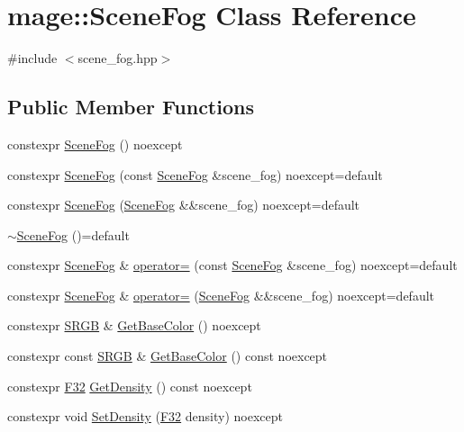 \hypertarget{classmage_1_1_scene_fog}{}\section{mage\+:\+:Scene\+Fog Class Reference}
\label{classmage_1_1_scene_fog}


{\ttfamily \#include $<$scene\+\_\+fog.\+hpp$>$}

\subsection*{Public Member Functions}
\begin{DoxyCompactItemize}
\item 
constexpr \hyperlink{classmage_1_1_scene_fog_a7761b9d8f1c16a175828bf11882717ea}{Scene\+Fog} () noexcept
\item 
constexpr \hyperlink{classmage_1_1_scene_fog_a0b13e24eaa1d54e03b82475a5d0823a8}{Scene\+Fog} (const \hyperlink{classmage_1_1_scene_fog}{Scene\+Fog} \&scene\+\_\+fog) noexcept=default
\item 
constexpr \hyperlink{classmage_1_1_scene_fog_a85281feff6fff05548d29f272f54fe4d}{Scene\+Fog} (\hyperlink{classmage_1_1_scene_fog}{Scene\+Fog} \&\&scene\+\_\+fog) noexcept=default
\item 
\hyperlink{classmage_1_1_scene_fog_afb25181d31f74e4981c226019fee0669}{$\sim$\+Scene\+Fog} ()=default
\item 
constexpr \hyperlink{classmage_1_1_scene_fog}{Scene\+Fog} \& \hyperlink{classmage_1_1_scene_fog_aab29517edb102040e5e4a1c5bad418b8}{operator=} (const \hyperlink{classmage_1_1_scene_fog}{Scene\+Fog} \&scene\+\_\+fog) noexcept=default
\item 
constexpr \hyperlink{classmage_1_1_scene_fog}{Scene\+Fog} \& \hyperlink{classmage_1_1_scene_fog_a2b673372d2dea718361cb5a84454e7e0}{operator=} (\hyperlink{classmage_1_1_scene_fog}{Scene\+Fog} \&\&scene\+\_\+fog) noexcept=default
\item 
constexpr \hyperlink{structmage_1_1_s_r_g_b}{S\+R\+GB} \& \hyperlink{classmage_1_1_scene_fog_ac60d69f3aff33717a0bf32cc49e5f00e}{Get\+Base\+Color} () noexcept
\item 
constexpr const \hyperlink{structmage_1_1_s_r_g_b}{S\+R\+GB} \& \hyperlink{classmage_1_1_scene_fog_a0180c6682f2ee226efa025403d36e102}{Get\+Base\+Color} () const noexcept
\item 
constexpr \hyperlink{namespacemage_aa97e833b45f06d60a0a9c4fc22ae02c0}{F32} \hyperlink{classmage_1_1_scene_fog_a25f35f02f71503656e7eaeeb9fdbfde4}{Get\+Density} () const noexcept
\item 
constexpr void \hyperlink{classmage_1_1_scene_fog_a45af4587ff29f16883545b3be7b0ab06}{Set\+Density} (\hyperlink{namespacemage_aa97e833b45f06d60a0a9c4fc22ae02c0}{F32} density) noexcept
\end{DoxyCompactItemize}
